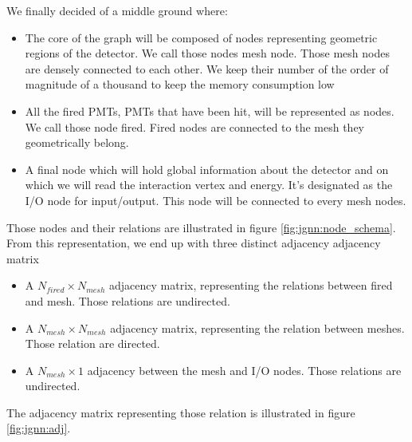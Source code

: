 \documentclass[../main.tex]{subfiles}
\begin{document}
We finally decided of a middle ground where:
\begin{itemize}
  \item The core of the graph will be composed of nodes representing geometric regions of the detector. We call those nodes {\color{Dandelion} mesh} node. Those mesh nodes are densely connected to each other. We keep their number of the order of magnitude of a thousand to keep the memory consumption low
  \item All the fired PMTs, PMTs that have been hit, will be represented as nodes. We call those node {\color{red} fired}. Fired nodes are connected to the mesh they geometrically belong.
  \item A final node which will hold global information about the detector and on which we will read the interaction vertex and energy. It's designated as the {\color{blue} I/O} node for input/output. This node will be connected to every mesh nodes.
\end{itemize}
Those nodes and their relations are illustrated in figure \ref{fig:jgnn:node_schema}. From this representation, we end up with three distinct adjacency adjacency matrix
\begin{itemize}
  \item A $N_{fired} \times N_{mesh}$ adjacency matrix, representing the relations between fired and mesh. Those relations are undirected.
  \item A $N_{mesh} \times N_{mesh}$ adjacency matrix, representing the relation between meshes. Those relation are directed.
  \item A $N_{mesh} \times 1$ adjacency between the mesh and I/O nodes. Those relations are undirected.
\end{itemize}
The adjacency matrix representing those relation is illustrated in figure \ref{fig:jgnn:adj}.
\end{document}
